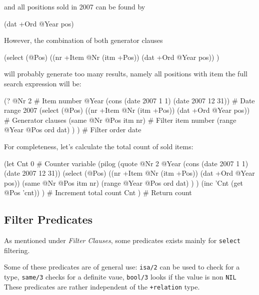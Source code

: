 and all positions sold in 2007 can be found by


\begin{wideverbatim}
(dat +Ord @Year pos)
\end{wideverbatim}

However, the combination of both generator clauses


\begin{wideverbatim}
(select (@Pos)
   ((nr +Item @Nr (itm +Pos)) (dat +Ord @Year pos)) )
\end{wideverbatim}

will probably generate too many results, namely all positions with item
the full search expression will be:


\begin{wideverbatim}
(?
   @Nr 2                                                 # Item number
   @Year (cons (date 2007 1 1) (date 2007 12 31))        # Date range 2007
   (select (@Pos)
      ((nr +Item @Nr (itm +Pos)) (dat +Ord @Year pos))   # Generator clauses
      (same @Nr @Pos itm nr)                             # Filter item number
      (range @Year @Pos ord dat) ) )                     # Filter order date
\end{wideverbatim}

For completeness, let's calculate the total count of sold items:


\begin{wideverbatim}
(let Cnt 0     # Counter variable
   (pilog
      (quote
         @Nr 2
         @Year (cons (date 2007 1 1) (date 2007 12 31))
         (select (@Pos)
            ((nr +Item @Nr (itm +Pos)) (dat +Ord @Year pos))
            (same @Nr @Pos itm nr)
            (range @Year @Pos ord dat) ) )
      (inc 'Cnt (get @Pos 'cnt)) )  # Increment total count
   Cnt )  # Return count
\end{wideverbatim}

 
\subsection{Filter Predicates}
\label{sec:select-pred-filter-predicates}


As mentioned under \emph{Filter Clauses}, some predicates exists
mainly for \texttt{select} filtering.

Some of these predicates are of general use: \texttt{isa/2} can be used to
check for a type, \texttt{same/3} checks for a definite vaue, \texttt{bool/3} looks if
the value is non \texttt{NIL}  These predicates are rather independent of the
\texttt{+relation} type.

